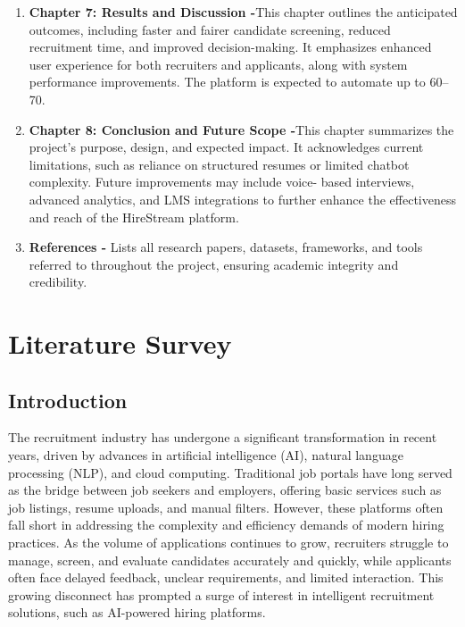 \documentclass[a4paper, 12pt]{report}
\begin{document}
\begin{enumerate}[itemsep=-4pt, label=\textbf{\roman*.}]
    \item \textbf{Chapter 7: Results and Discussion -}This chapter outlines the anticipated outcomes, including faster and fairer candidate screening, reduced recruitment time, and improved decision-making. It emphasizes enhanced user experience for both recruiters and applicants, along with system performance improvements. The platform is expected to automate up to 60–70.
    
    \item \textbf{Chapter 8: Conclusion and Future Scope -}This chapter summarizes the project’s purpose, design, and expected impact. It acknowledges current limitations, such as reliance on structured resumes or limited chatbot complexity. Future improvements may include voice- based interviews, advanced analytics, and LMS integrations to further enhance the effectiveness and reach of the HireStream platform.
    
    \item \textbf{References -} Lists all research papers, datasets, frameworks, and tools referred to throughout the project, ensuring academic integrity and credibility.
\end{enumerate}


\chapter{Literature Survey}

\section{Introduction}
The recruitment industry has undergone a significant transformation in recent years, driven by advances in artificial intelligence (AI), natural language processing (NLP), and cloud computing. Traditional job portals have long served as the bridge between job seekers and employers, offering basic services such as job listings, resume uploads, and manual filters. However, these platforms often fall short in addressing the complexity and efficiency demands of modern hiring practices. As the volume of applications continues to grow, recruiters struggle to manage, screen, and evaluate candidates accurately and quickly, while applicants often face delayed feedback, unclear requirements, and limited interaction. This growing disconnect has prompted a surge of interest in intelligent recruitment solutions, such as AI-powered hiring platforms.
\end{document}
